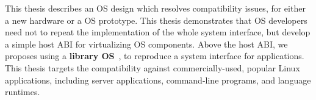 This thesis describes an OS design which resolves compatibility issues, for either a new hardware or a OS prototype.
This thesis demonstrates that OS developers need not to repeat the implementation of
the whole system interface,
but develop a simple host ABI for virtualizing OS components.
Above the host ABI, we proposes using a {\bf library OS}~\cite{porter11drawbridge,engler95exokernel,libra,unikernels},
to reproduce a system interface for applications.
This thesis targets the compatibility against commercially-used, popular Linux applications, including server applications, command-line programs, and language runtimes.




